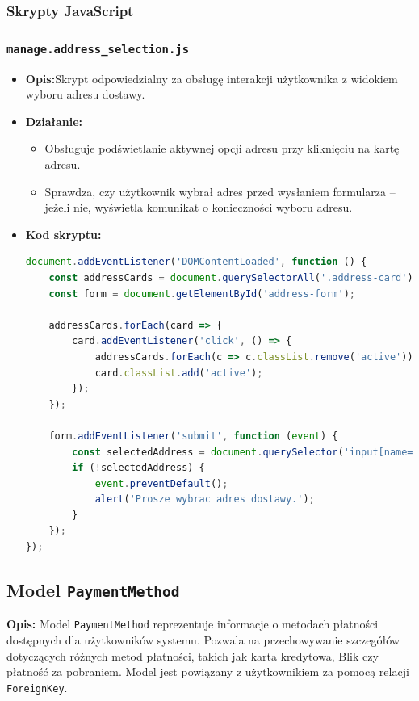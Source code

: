 \documentclass[12pt,a4paper,oneside]{article}
\theoremstyle{definition}
\numberwithin{equation}{section}
\begin{document}
\subsubsection{Skrypty JavaScript}

\subsubsection*{\texttt{manage.address\_selection.js}}
\begin{itemize}
    \item \textbf{Opis:}Skrypt odpowiedzialny za obsługę interakcji użytkownika z widokiem wyboru adresu dostawy.
    \item \textbf{Działanie:}
        \begin{itemize}
            \item Obsługuje podświetlanie aktywnej opcji adresu przy kliknięciu na kartę adresu.
            \item Sprawdza, czy użytkownik wybrał adres przed wysłaniem formularza – jeżeli nie, wyświetla komunikat o konieczności wyboru adresu.
        \end{itemize}
    \item \textbf{Kod skryptu:}
\begin{lstlisting}[language=JavaScript, caption=Skrypt manage.address\_choice.js]
document.addEventListener('DOMContentLoaded', function () {
    const addressCards = document.querySelectorAll('.address-card');
    const form = document.getElementById('address-form');

    addressCards.forEach(card => {
        card.addEventListener('click', () => {
            addressCards.forEach(c => c.classList.remove('active'));
            card.classList.add('active');
        });
    });

    form.addEventListener('submit', function (event) {
        const selectedAddress = document.querySelector('input[name="selected_address"]:checked');
        if (!selectedAddress) {
            event.preventDefault();
            alert('Prosze wybrac adres dostawy.');
        }
    });
});
\end{lstlisting}
\end{itemize}


% 
% 
\clearpage
\subsection{Model \texttt{PaymentMethod}}

\textbf{Opis:}  
Model \texttt{PaymentMethod} reprezentuje informacje o metodach płatności dostępnych dla użytkowników systemu. Pozwala na przechowywanie szczegółów dotyczących różnych metod płatności, takich jak karta kredytowa, Blik czy płatność za pobraniem. Model jest powiązany z użytkownikiem za pomocą relacji \texttt{ForeignKey}.
\end{document}
